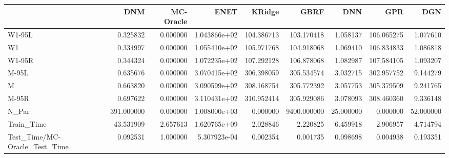 \begin{tabular}{lrrrrrrrr}
\toprule
{} &         DNM &  MC-Oracle &          ENET &      KRidge &         GBRF &        DNN &         GPR &        DGN \\
\midrule
W1-95L                        &    0.325832 &   0.000000 &  1.043866e+02 &  104.386713 &   103.170418 &   1.058137 &  106.065275 &   1.077610 \\
W1                            &    0.334997 &   0.000000 &  1.055410e+02 &  105.971768 &   104.918068 &   1.069410 &  106.834833 &   1.086818 \\
W1-95R                        &    0.344324 &   0.000000 &  1.072235e+02 &  107.292128 &   106.878068 &   1.082987 &  107.584105 &   1.093207 \\
M-95L                         &    0.635676 &   0.000000 &  3.070415e+02 &  306.398059 &   305.534574 &   3.032715 &  302.957752 &   9.144279 \\
M                             &    0.663820 &   0.000000 &  3.090599e+02 &  308.168754 &   305.772392 &   3.057753 &  305.379509 &   9.241765 \\
M-95R                         &    0.697622 &   0.000000 &  3.110431e+02 &  310.952414 &   305.929086 &   3.078093 &  308.460360 &   9.336148 \\
N\_Par                         &  391.000000 &   0.000000 &  1.008000e+03 &    0.000000 &  9400.000000 &  25.000000 &    0.000000 &  52.000000 \\
Train\_Time                    &   43.531909 &   2.657613 &  1.620765e+09 &    2.028846 &     2.220825 &   6.459918 &    2.906957 &   4.714794 \\
Test\_Time/MC-Oracle\_Test\_Time &    0.092531 &   1.000000 &  5.307923e-04 &    0.002354 &     0.001735 &   0.098698 &    0.004938 &   0.193351 \\
\bottomrule
\end{tabular}
